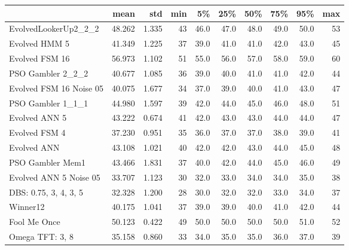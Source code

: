 \begin{tabular}{lrrrrrrrrr}
\toprule
{} &    mean &    std &  min &    5\% &   25\% &   50\% &   75\% &   95\% &  max \\
\midrule
EvolvedLookerUp2\_2\_2    &  48.262 &  1.335 &   43 &  46.0 &  47.0 &  48.0 &  49.0 &  50.0 &   53 \\
Evolved HMM 5           &  41.349 &  1.225 &   37 &  39.0 &  41.0 &  41.0 &  42.0 &  43.0 &   45 \\
Evolved FSM 16          &  56.973 &  1.102 &   51 &  55.0 &  56.0 &  57.0 &  58.0 &  59.0 &   60 \\
PSO Gambler 2\_2\_2       &  40.677 &  1.085 &   36 &  39.0 &  40.0 &  41.0 &  41.0 &  42.0 &   44 \\
Evolved FSM 16 Noise 05 &  40.075 &  1.677 &   34 &  37.0 &  39.0 &  40.0 &  41.0 &  43.0 &   47 \\
PSO Gambler 1\_1\_1       &  44.980 &  1.597 &   39 &  42.0 &  44.0 &  45.0 &  46.0 &  48.0 &   51 \\
Evolved ANN 5           &  43.222 &  0.674 &   41 &  42.0 &  43.0 &  43.0 &  44.0 &  44.0 &   47 \\
Evolved FSM 4           &  37.230 &  0.951 &   35 &  36.0 &  37.0 &  37.0 &  38.0 &  39.0 &   41 \\
Evolved ANN             &  43.108 &  1.021 &   40 &  42.0 &  42.0 &  43.0 &  44.0 &  45.0 &   48 \\
PSO Gambler Mem1        &  43.466 &  1.831 &   37 &  40.0 &  42.0 &  44.0 &  45.0 &  46.0 &   49 \\
Evolved ANN 5 Noise 05  &  33.707 &  1.123 &   30 &  32.0 &  33.0 &  34.0 &  34.0 &  35.0 &   38 \\
DBS: 0.75, 3, 4, 3, 5   &  32.328 &  1.200 &   28 &  30.0 &  32.0 &  32.0 &  33.0 &  34.0 &   37 \\
Winner12                &  40.175 &  1.041 &   37 &  39.0 &  39.0 &  40.0 &  41.0 &  42.0 &   44 \\
Fool Me Once            &  50.123 &  0.422 &   49 &  50.0 &  50.0 &  50.0 &  50.0 &  51.0 &   52 \\
Omega TFT: 3, 8         &  35.158 &  0.860 &   33 &  34.0 &  35.0 &  35.0 &  36.0 &  37.0 &   39 \\
\bottomrule
\end{tabular}
